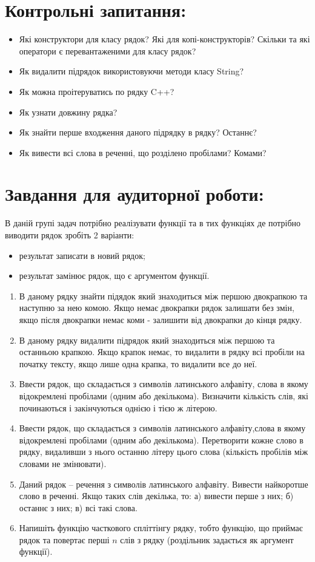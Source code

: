 \documentclass[a5paper,titlepage,openany,twoside,draft]{book_unv}%
\begin{document}
\section{Контрольні запитання:}
\begin{itemize}
\item
  Які конструктори для класу рядок? Які для копі-конструкторів? Скільки та
  які оператори є перевантаженими для класу рядок?
\item
  Як видалити підрядок використовуючи методи класу String?
\item
  Як можна проітеруватись по рядку C++?
\item
  Як узнати довжину рядка?
\item
  Як знайти перше входження даного підрядку в рядку? Останнє?
\item
  Як вивести всі слова в реченні, що розділено пробілами? Комами?
\end{itemize}

\section{Завдання для аудиторної роботи:}

В даній групі задач потрібно реалізувати функції та в тих функціях де
потрібно виводити рядок зробіть 2 варіанти:
\begin{itemize}
\item
 результат записати в новий рядок; 
\item
 результат замінює рядок, що є аргументом функції.
\end{itemize}

\begin{enumerate}
\def\labelenumi{\arabic{enumi})}
\item
  В даному рядку знайти підядок який знаходиться між першою 
двокрапкою та наступню за нею комою. Якщо немає двокрапки
рядок залишати без змін, якщо після двокрапки немає коми - залишити від
двокрапки до кінця рядку.
\item
  В даному рядку видалити підрядок який знаходиться між першою 
та останньою крапкою. Якщо крапок немає, то видалити в рядку всі пробіли
на початку тексту, якщо лише одна крапка, то видалити все до неї.
\item
  Ввести рядок, що складається з символів латинського алфавіту, слова в якому
  відокремлені пробілами (одним або декількома). Визначити кількість слів,
  які починаються і закінчуються однією і тією ж літерою.
\item
  Ввести рядок, що складається з символів латинського алфавіту,слова в якому
  відокремлені пробілами (одним або декількома). Перетворити кожне слово в
  рядку, видаливши з нього останню літеру цього 
  слова (кількість пробілів між словами не змінювати).
\item
  Даний рядок -- речення з символів латинського алфавіту. Вивести
  найкоротше слово в реченні. Якщо таких слів декілька, то: 
  а) вивести перше з них; б) останнє з них; в) всі такі слова.
\item
  Напишіть функцію часткового спліттінгу рядку, тобто функцію, що
  приймає рядок та повертає перші $n$ слів з рядку (роздільник задається
  як аргумент функції).
\end{enumerate}
\end{document}
